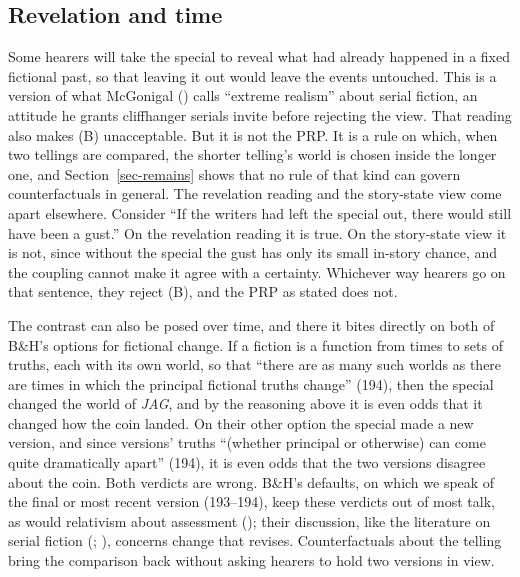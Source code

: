 \documentclass[
  11pt,
  letterpaper,
  DIV=11,
  numbers=noendperiod,
  twoside]{scrartcl}
\begin{document}
\subsection{Revelation and time}\label{revelation-and-time}

Some hearers will take the special to reveal what had already happened
in a fixed fictional past, so that leaving it out would leave the events
untouched. This is a version of what McGonigal
() calls ``extreme realism''
about serial fiction, an attitude he grants cliffhanger serials invite
before rejecting the view. That reading also makes (B) unacceptable. But
it is not the PRP. It is a rule on which, when two tellings are
compared, the shorter telling's world is chosen inside the longer one,
and Section~\ref{sec-remains} shows that no rule of that kind can govern
counterfactuals in general. The revelation reading and the story-state
view come apart elsewhere. Consider ``If the writers had left the
special out, there would still have been a gust.'' On the revelation
reading it is true. On the story-state view it is not, since without the
special the gust has only its small in-story chance, and the coupling
cannot make it agree with a certainty. Whichever way hearers go on that
sentence, they reject (B), and the PRP as stated does not.

The contrast can also be posed over time, and there it bites directly on
both of B\&H's options for fictional change. If a fiction is a function
from times to sets of truths, each with its own world, so that ``there
are as many such worlds as there are times in which the principal
fictional truths change'' (194), then the special changed the world of
\emph{JAG}, and by the reasoning above it is even odds that it changed
how the coin landed. On their other option the special made a new
version, and since versions' truths ``(whether principal or otherwise)
can come quite dramatically apart'' (194), it is even odds that the two
versions disagree about the coin. Both verdicts are wrong. B\&H's
defaults, on which we speak of the final or most recent version
(193--194), keep these verdicts out of most talk, as would relativism
about assessment (); their
discussion, like the literature on serial fiction
(; ), concerns change that revises. Counterfactuals about the telling
bring the comparison back without asking hearers to hold two versions in
view.
\end{document}
